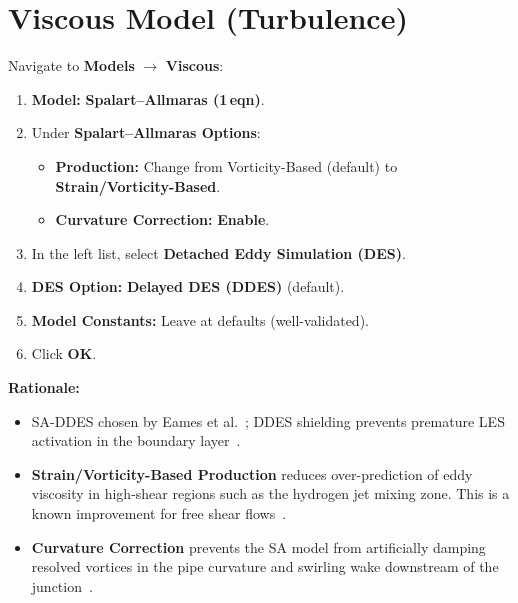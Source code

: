 \documentclass[12pt,a4paper]{report}
\begin{document}
\section{Viscous Model (Turbulence)}

Navigate to \textbf{Models} $\rightarrow$ \textbf{Viscous}:

\begin{enumerate}
  \item \textbf{Model:} \textbf{Spalart--Allmaras (1\,eqn)}.
  \item Under \textbf{Spalart--Allmaras Options}:
  \begin{itemize}
    \item \textbf{Production:} Change from Vorticity-Based (default) to
          \textbf{Strain/Vorticity-Based}.
    \item \textbf{Curvature Correction:} \textbf{Enable}.
  \end{itemize}
  \item In the left list, select \textbf{Detached Eddy Simulation (DES)}.
  \item \textbf{DES Option:} \textbf{Delayed DES (DDES)} (default).
  \item \textbf{Model Constants:} Leave at defaults (well-validated).
  \item Click \textbf{OK}.
\end{enumerate}

\noindent\textbf{Rationale:}
\begin{itemize}
  \item SA-DDES chosen by Eames et al.~\cite{Eames2022}; DDES shielding
        prevents premature LES activation in the boundary
        layer~\cite{Spalart2006, Shur2008}.
  \item \textbf{Strain/Vorticity-Based Production} reduces over-prediction
        of eddy viscosity in high-shear regions such as the hydrogen jet
        mixing zone.  This is a known improvement for free shear
        flows~\cite{SpalartAllmaras1994}.
  \item \textbf{Curvature Correction} prevents the SA model from
        artificially damping resolved vortices in the pipe curvature and
        swirling wake downstream of the junction~\cite{Spalart2006}.
\end{itemize}

\medskip
\noindent{}
\end{document}
